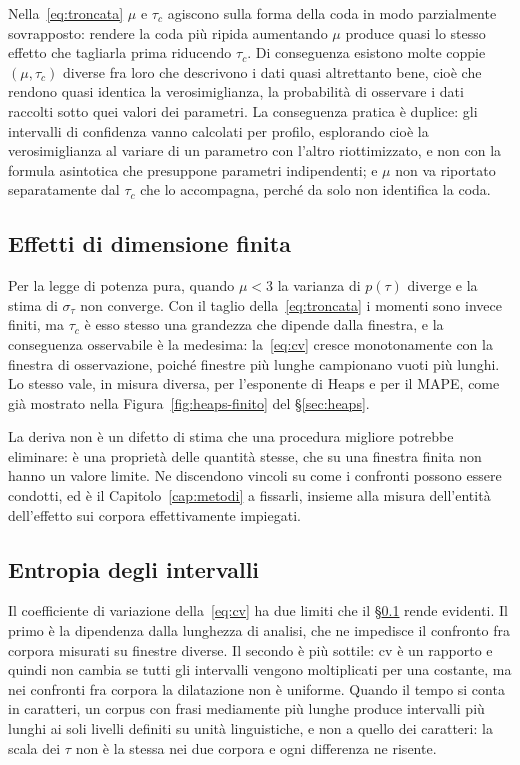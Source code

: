 Nella~\eqref{eq:troncata} $\mu$ e $\tau_c$ agiscono sulla forma della coda in
modo parzialmente sovrapposto: rendere la coda più ripida aumentando $\mu$
produce quasi lo stesso effetto che tagliarla prima riducendo $\tau_c$. Di
conseguenza esistono molte coppie $(\mu, \tau_c)$ diverse fra loro che
descrivono i dati quasi altrettanto bene, cioè che rendono quasi identica la
verosimiglianza, la probabilità di osservare i dati raccolti sotto quei valori
dei parametri. La conseguenza pratica è duplice: gli intervalli di confidenza
vanno calcolati per profilo, esplorando cioè la verosimiglianza al variare di
un parametro con l'altro riottimizzato, e non con la formula asintotica che
presuppone parametri indipendenti; e $\mu$ non va riportato separatamente dal
$\tau_c$ che lo accompagna, perché da solo non identifica la coda.

\subsection{Effetti di dimensione finita}
\label{sec:lunghezza}

Per la legge di potenza pura, quando $\mu<3$ la varianza di $p(\tau)$ diverge e
la stima di $\sigma_\tau$ non converge. Con il taglio della~\eqref{eq:troncata}
i momenti sono invece finiti, ma $\tau_c$ è esso stesso una grandezza che
dipende dalla finestra, e la conseguenza osservabile è la medesima:
la~\eqref{eq:cv} cresce monotonamente con la finestra di osservazione,
poiché finestre più lunghe campionano vuoti più lunghi. Lo stesso vale, in
misura diversa, per l'esponente di Heaps e per il MAPE, come già mostrato nella
Figura~\ref{fig:heaps-finito} del §\ref{sec:heaps}.

La deriva non è un difetto di stima che una procedura migliore potrebbe
eliminare: è una proprietà delle quantità stesse, che su una finestra finita non
hanno un valore limite. Ne discendono vincoli su come i confronti possono essere
condotti, ed è il Capitolo~\ref{cap:metodi} a fissarli, insieme alla misura
dell'entità dell'effetto sui corpora effettivamente impiegati.


\subsection{Entropia degli intervalli}
\label{sec:entropia-intervalli-def}

Il coefficiente di variazione della~\eqref{eq:cv} ha due limiti che il
§\ref{sec:lunghezza} rende evidenti. Il primo è la dipendenza dalla lunghezza
di analisi, che ne impedisce il confronto fra corpora misurati su finestre
diverse. Il secondo è più sottile: $\mathrm{cv}$ è un rapporto e quindi non
cambia se tutti gli intervalli vengono moltiplicati per una costante, ma nei
confronti fra corpora la dilatazione non è uniforme. Quando il tempo si conta in
caratteri, un corpus con frasi mediamente più lunghe produce intervalli più
lunghi ai soli livelli definiti su unità linguistiche, e non a quello dei
caratteri: la scala dei $\tau$ non è la stessa nei due corpora e ogni
differenza ne risente.

